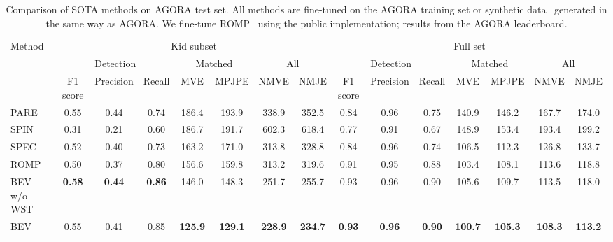 \documentclass[10pt,twocolumn,letterpaper]{article}
\begin{document}
\begin{table*}[t]
\setlength\tabcolsep{3pt}
	\footnotesize
	\centering
\begin{tabular}{l|ccc|cc|cc|ccc|cc|cc}
	\toprule
 \multirow{3}{*}{Method}&  \multicolumn{7}{c|}{Kid subset} & \multicolumn{7}{c}{Full set} \\
	\cline{2-15}
& \multicolumn{3}{c|}{Detection} & \multicolumn{2}{c|}{Matched}  &  \multicolumn{2}{c|}{All} & \multicolumn{3}{c|}{Detection} & \multicolumn{2}{c|}{Matched}  &  \multicolumn{2}{c}{All} \\
\cline{2-15}
&  \multicolumn{1}{c}{F1 score} & \multicolumn{1}{c}{Precision} & \multicolumn{1}{c|}{Recall} & \multicolumn{1}{c}{MVE} & \multicolumn{1}{c|}{MPJPE} & \multicolumn{1}{c}{NMVE} & \multicolumn{1}{c|}{NMJE} &  \multicolumn{1}{c}{F1 score} & \multicolumn{1}{c}{Precision} & \multicolumn{1}{c|}{Recall} & \multicolumn{1}{c}{MVE} & \multicolumn{1}{c|}{MPJPE} & \multicolumn{1}{c}{NMVE} & \multicolumn{1}{c}{NMJE} \\
\midrule
PARE~\cite{kocabas2021pare}& 0.55 & 0.44 & 0.74 & 186.4 & 193.9 & 338.9 & 352.5 & 0.84 & 0.96 & 0.75 & 140.9 & 146.2 & 167.7 & 174.0\\
SPIN~\cite{patel2021agora}& 0.31 & 0.21 & 0.60 & 186.7 & 191.7 & 602.3 & 618.4 & 0.77 & 0.91 & 0.67 & 148.9 & 153.4 & 193.4 & 199.2\\
SPEC~\cite{Kocabas_SPEC_2021} & 0.52 & 0.40 & 0.73 & 163.2 & 171.0 & 313.8 & 328.8 & 0.84 & 0.96 & 0.74 & 106.5 & 112.3 & 126.8 & 133.7 \\
ROMP~\cite{romp} & 0.50 & 0.37 & 0.80 & 156.6 & 159.8 & 313.2& 319.6 & 0.91 & 0.95 & 0.88 & 103.4 & 108.1 & 113.6 & 118.8\\
BEV w/o WST  & \textbf{0.58} & \textbf{0.44} & \textbf{0.86} & 146.0 & 148.3 & 251.7 & 255.7 & 0.93 & 0.96 & 0.90 & 105.6 & 109.7 & 113.5 & 118.0\\
BEV  & 0.55 & 0.41 & 0.85 & \textbf{125.9} &\textbf{129.1} & \textbf{228.9} & \textbf{234.7} & \textbf{0.93} & \textbf{0.96} & \textbf{0.90} & \textbf{100.7} & \textbf{105.3} & \textbf{108.3} & \textbf{113.2} \\
\bottomrule
\end{tabular}
\vspace{-0.1in}
	\caption{Comparison of SOTA methods on AGORA test set. All methods are fine-tuned on the AGORA training set or synthetic data~\cite{Kocabas_SPEC_2021} generated in the same way as AGORA. We fine-tune ROMP~\cite{romp} using the public implementation; results from  the AGORA leaderboard.}
	\label{tab:agora}
\end{table*}
\end{document}
